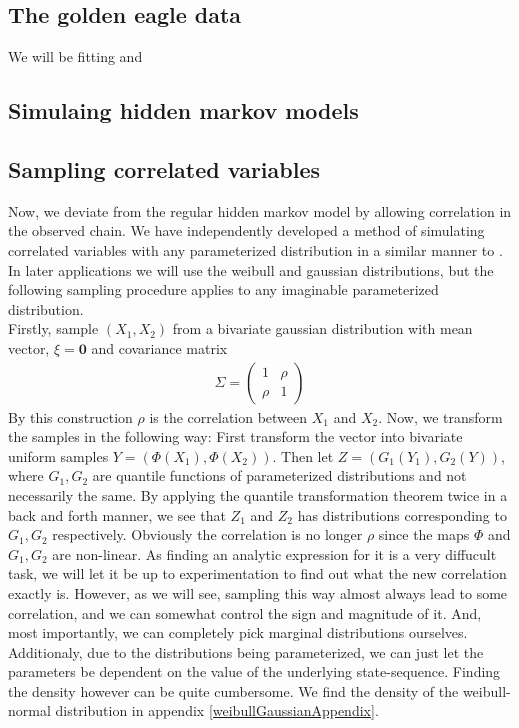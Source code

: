 \subsection{The golden eagle data }
We will be fitting and 
\subsection{Simulaing hidden markov models}

\subsection{Sampling correlated variables}\label{correlatedVariables}
Now, we deviate from the regular hidden markov model by allowing correlation in the observed chain. We have independently developed a method of simulating correlated variables with any parameterized distribution in a similar manner to \cite{thomasWard}. In later applications we will use the weibull and gaussian distributions, but the following sampling procedure applies to any imaginable parameterized distribution.\\ Firstly, sample $(X_1, X_2)$ from a bivariate gaussian distribution with mean vector, $\xi = \mathbf{0}$ and covariance matrix 
\begin{align}\Sigma = \begin{pmatrix}
    1 & \rho \\
    \rho & 1
\end{pmatrix}
\end{align}
By this construction $\rho$ is the correlation between $X_1$ and $X_2$. Now, we transform the samples in the following way: First transform the vector into bivariate uniform samples $Y = (\Phi(X_1),\Phi(X_2))$. Then let $Z = (G_1(Y_1), G_2(Y))$, where $G_1, G_2$ are quantile functions of parameterized distributions and not necessarily the same. By applying the quantile transformation theorem twice in a back and forth manner, we see that $Z_1$ and $Z_2$ has distributions corresponding to $G_1, G_2$ respectively. Obviously the correlation is no longer $\rho$ since the maps $\Phi$ and $G_1, G_2$ are non-linear. As finding an analytic expression for it is a very diffucult task, we will let it be up to experimentation to find out what the new correlation exactly is. However, as we will see, sampling this way almost always lead to some correlation, and we can somewhat control the sign and magnitude of it. And, most importantly, we can completely pick marginal distributions ourselves. Additionaly, due to the distributions being parameterized, we can just let the parameters be dependent on the value of the underlying state-sequence. Finding the density however can be quite cumbersome. We find the density of the weibull-normal distribution in appendix \ref{weibullGaussianAppendix}.